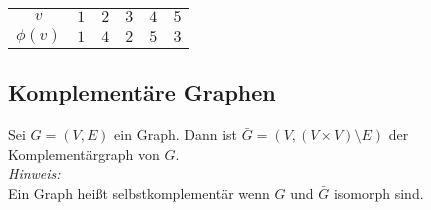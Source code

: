 \begin{tabular}{c|c|c|c|c|c}
$v$ & $1$ & $2$ & $3$ & $4$ & $5$ \\ 
$\phi (v)$ & $1$ & $4$ & $2$ & $5$ & $3$ \\
\end{tabular}
\subsection*{Komplementäre Graphen}
Sei $G=(V,E)$ ein Graph. Dann ist $\bar{G}=(V,(V\times V)\setminus E)$ der Komplementärgraph von $G$.\\
\emph{Hinweis:}\\
Ein Graph heißt selbstkomplementär wenn $G$ und $\bar{G}$ isomorph sind.
